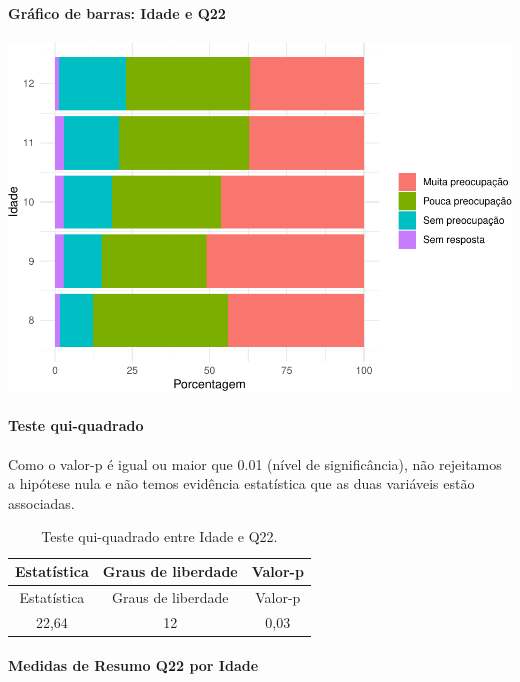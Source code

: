 \documentclass[]{article}
\let\oldparagraph\paragraph
\renewcommand{\paragraph}[1]{\oldparagraph{#1}\mbox{}}
\begin{document}
\hypertarget{gruxe1fico-de-barras-idade-e-q22}{%
\paragraph{Gráfico de barras: Idade e Q22}\label{gruxe1fico-de-barras-idade-e-q22}}

\begin{center}\includegraphics[width=0.75\linewidth]{relatorio_covid19_files/figure-latex/unnamed-chunk-506-1} \end{center}

\hypertarget{teste-qui-quadrado-44}{%
\paragraph{Teste qui-quadrado}\label{teste-qui-quadrado-44}}

Como o valor-p é igual ou maior que 0.01 (nível de significância), não rejeitamos a hipótese nula e não temos evidência estatística que as duas variáveis estão associadas.

\begin{longtable}[]{@{}ccc@{}}
\caption{\label{tab:unnamed-chunk-508}Teste qui-quadrado entre Idade e Q22.}\tabularnewline
\toprule
Estatística & Graus de liberdade & Valor-p\tabularnewline
\midrule
\endfirsthead
\toprule
Estatística & Graus de liberdade & Valor-p\tabularnewline
\midrule
\endhead
22,64 & 12 & 0,03\tabularnewline
\bottomrule
\end{longtable}

\cleardoublepage

\hypertarget{medidas-de-resumo-q22-por-idade}{%
\paragraph{Medidas de Resumo Q22 por Idade}\label{medidas-de-resumo-q22-por-idade}}
\end{document}
